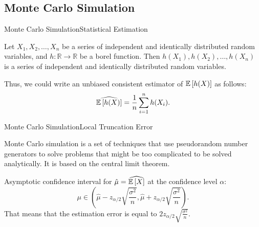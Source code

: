 \subsection{Monte Carlo Simulation}
    \begin{frame}{Monte Carlo Simulation}{Statistical Estimation}
        \begin{lemma}
            Let $X_1, X_2, \dots, X_n$ be a series of independent and identically distributed random variables, and $h: \mathbb{R} \to \mathbb{R}$ be a borel function. Then $h(X_1), h(X_2), \dots, h(X_n)$ is a series of independent and identically distributed random variables.
        \end{lemma}
        Thus, we could write an unbiased consistent estimator of $\mathbb{E} \left[h(X)\right]$ as follows:
        \begin{equation}
            \widehat{\mathbb{E} \left[h(X)\right]} = \frac{1}{n} \sum_{i=1}^n h(X_i).
        \end{equation}
    \end{frame}

    \begin{frame}{Monte Carlo Simulation}{Local Truncation Error}
        \begin{definition}
            Monte Carlo simulation is a set of techniques that use pseudorandom number generators to solve problems that might be too complicated to be solved analytically. It is based on the central limit theorem.
        \end{definition}
        Asymptotic confidence interval for $\hat{\mu} = \widehat{\mathbb{E}\left[X\right]}$ at the confidence level $\alpha$:
        \begin{equation}
            \mu \in \left(\hat{\mu} - z_{\alpha/2} \sqrt{\frac{\sigma^2}{n}}, \hat{\mu} + z_{\alpha/2} \sqrt{\frac{\sigma^2}{n}}\right).
        \end{equation}
        That means that the estimation error is equal to $2z_{\alpha/2} \sqrt{\frac{\sigma^2}{n}}$.
    \end{frame}